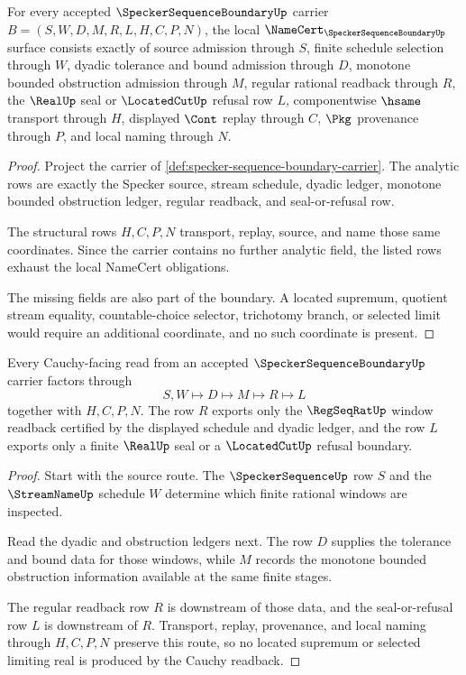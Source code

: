 \begin{theorem}\label{thm:specker-sequence-boundary-namecert-obligations}
For every accepted $\SpeckerSequenceBoundaryUp$ carrier $B=(S,W,D,M,R,L,H,C,P,N)$, the local $\NameCert_{\SpeckerSequenceBoundaryUp}$ surface consists exactly of source admission through $S$, finite schedule selection through $W$, dyadic tolerance and bound admission through $D$, monotone bounded obstruction admission through $M$, regular rational readback through $R$, the $\RealUp$ seal or $\LocatedCutUp$ refusal row $L$, componentwise $\hsame$ transport through $H$, displayed $\Cont$ replay through $C$, $\Pkg$ provenance through $P$, and local naming through $N$.
\end{theorem}
\begin{proof}
Project the carrier of \autoref{def:specker-sequence-boundary-carrier}. The analytic rows are exactly the Specker source, stream schedule, dyadic ledger, monotone bounded obstruction ledger, regular readback, and seal-or-refusal row.

The structural rows $H,C,P,N$ transport, replay, source, and name those same coordinates. Since the carrier contains no further analytic field, the listed rows exhaust the local NameCert obligations.

The missing fields are also part of the boundary. A located supremum, quotient stream equality, countable-choice selector, trichotomy branch, or selected limit would require an additional coordinate, and no such coordinate is present.
\end{proof}

\begin{theorem}\label{thm:specker-sequence-boundary-cauchy-readback}
Every Cauchy-facing read from an accepted $\SpeckerSequenceBoundaryUp$ carrier factors through
$$
S,W\longmapsto D\longmapsto M\longmapsto R\longmapsto L
$$
together with $H,C,P,N$. The row $R$ exports only the $\RegSeqRatUp$ window readback certified by the displayed schedule and dyadic ledger, and the row $L$ exports only a finite $\RealUp$ seal or a $\LocatedCutUp$ refusal boundary.
\end{theorem}
\begin{proof}
Start with the source route. The $\SpeckerSequenceUp$ row $S$ and the $\StreamNameUp$ schedule $W$ determine which finite rational windows are inspected.

Read the dyadic and obstruction ledgers next. The row $D$ supplies the tolerance and bound data for those windows, while $M$ records the monotone bounded obstruction information available at the same finite stages.

The regular readback row $R$ is downstream of those data, and the seal-or-refusal row $L$ is downstream of $R$. Transport, replay, provenance, and local naming through $H,C,P,N$ preserve this route, so no located supremum or selected limiting real is produced by the Cauchy readback.
\end{proof}

